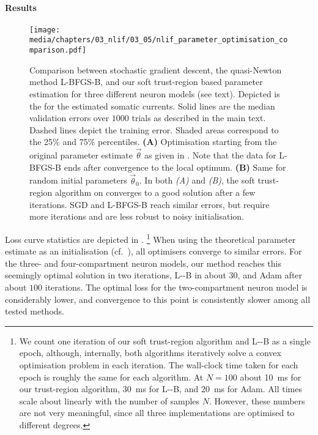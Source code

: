 \paragraph{Results}

\begin{figure}
	\texttt{[image: media/chapters/03\_nlif/03\_05/nlif\_parameter\_optimisation\_comparison.pdf]}%
	{\label{fig:nlif_parameter_optimisation_comparison_a}}%
	{\label{fig:nlif_parameter_optimisation_comparison_b}}%
	\caption[Comparing different optimisers performing parameter optimisation]{Comparison between stochastic gradient descent, the quasi-Newton method L-BFGS-B, and our soft trust-region based parameter estimation for three different neuron models (see text).
	Depicted is the \NRMSE for the estimated somatic currents.
	Solid lines are the median validation errors over $1000$ trials as described in the main text.
	Dashed lines depict the training error.
	Shaded areas correspond to the 25\% and 75\% percentiles.
	\textbf{(A)} Optimisation starting from the original parameter estimate $\vec \theta$ as given in .
	Note that the data for L-BFGS-B ends after convergence to the local optimum.
	\textbf{(B)} Same for random initial parameters $\vec \theta_0$.
	In both \emph{(A)} and \emph{(B)}, the soft trust-region algorithm on converges to a good solution after a few iterations.
	SGD and L-BFGS-B reach similar errors, but require more iterations and are less robust to noisy initialisation.
	}
	\label{fig:nlif_parameter_optimisation_comparison}
\end{figure}

Loss curve statistics are depicted in .%
\footnote{
We count one iteration of our soft trust-region algorithm and L-\BFGS-B as a single epoch, although, internally, both algorithms iteratively solve a convex optimisation problem in each iteration.
The wall-clock time taken for each epoch is roughly the same for each algorithm.
At $N = 100$ about \SI{10}{\milli\second} for our trust-region algorithm, \SI{30}{\milli\second} for L-\BFGS-B, and \SI{20}{\milli\second} for Adam.
All times scale about linearly with the number of samples $N$.
However, these numbers are not very meaningful, since all three implementations are optimised to different degrees.
}
When using the theoretical parameter estimate as an initialisation (cf.~), all optimisers converge to similar errors.
For the three- and four-compartment neuron models, our method reaches this seemingly optimal solution in two iterations, L-\BFGS-B in about $30$, and Adam after about $100$ iterations.
The optimal loss for the two-compartment neuron model is considerably lower, and convergence to this point is consistently slower among all tested methods.

